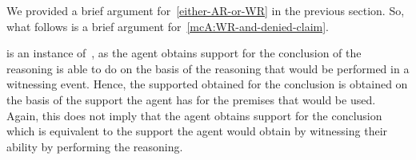 \begin{note}[To argument]
  {
    \color{red}
    We provided a brief argument for~\ref{either-AR-or-WR} in the previous section.
  }
  So, what follows is a brief argument for~\ref{mcA:WR-and-denied-claim}.
\end{note}

\begin{note}[Attribute]
  \WR{} is an instance of~\EAS{}, as the agent obtains support for the conclusion of the reasoning is able to do on the basis of the reasoning that would be performed in a witnessing event.
  Hence, the supported obtained for the conclusion is obtained on the basis of the support the agent has for the premises that would be used.
  Again, this does not imply that the agent obtains support for the conclusion which is equivalent to the support the agent would obtain by witnessing their ability by performing the reasoning.
\end{note}


